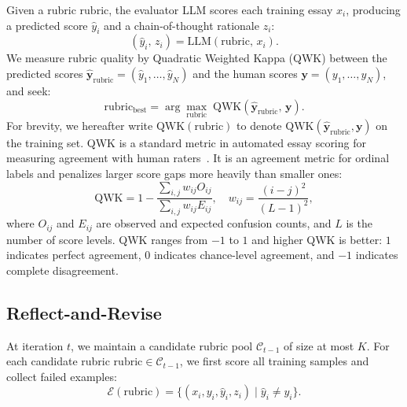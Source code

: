 \documentclass[11pt]{article}
\newcommand{\rubric}{\mathrm{rubric}}
\begin{document}
Given a rubric \(\rubric\), the evaluator LLM scores each training essay \(x_i\), producing a predicted score \(\hat{y}_i\) and a chain-of-thought rationale \(z_i\):
\begin{equation}
(\hat{y}_i,\, z_i) = \mathrm{LLM}(\rubric,\, x_i).
\end{equation}
We measure rubric quality by Quadratic Weighted Kappa (QWK) between the predicted scores \(\hat{\mathbf{y}}_{\rubric}=(\hat{y}_1,\dots,\hat{y}_N)\) and the human scores \(\mathbf{y}=(y_1,\dots,y_N)\), and seek:
\begin{equation}
\rubric_{\mathrm{best}} = \arg\max_{\rubric}\;\mathrm{QWK}(\hat{\mathbf{y}}_{\rubric},\,\mathbf{y}).
\end{equation}
For brevity, we hereafter write \(\mathrm{QWK}(\rubric)\) to denote \(\mathrm{QWK}(\hat{\mathbf{y}}_{\rubric},\mathbf{y})\) on the training set. QWK is a standard metric in automated essay scoring for measuring agreement with human raters~\citep{ijcai2019p879}. It is an agreement metric for ordinal labels and penalizes larger score gaps more heavily than smaller ones:
\begin{equation}
\mathrm{QWK} = 1 - \frac{\sum_{i,j} w_{ij} O_{ij}}{\sum_{i,j} w_{ij} E_{ij}}, \quad
w_{ij}=\frac{(i-j)^2}{(L-1)^2},
\end{equation}
where \(O_{ij}\) and \(E_{ij}\) are observed and expected confusion counts, and \(L\) is the number of score levels. QWK ranges from \(-1\) to \(1\) and higher QWK is better: \(1\) indicates perfect agreement, \(0\) indicates chance-level agreement, and \(-1\) indicates complete disagreement.

\subsection{Reflect-and-Revise}
At iteration \(t\), we maintain a candidate rubric pool \(\mathcal{C}_{t-1}\) of size at most \(K\). For each candidate rubric \(\rubric \in \mathcal{C}_{t-1}\), we first score all training samples and collect failed examples:
\begin{equation}
\mathcal{E}(\rubric)=\{(x_i,y_i,\hat{y}_i,z_i)\mid \hat{y}_i \neq y_i\}.
\end{equation}
\end{document}
